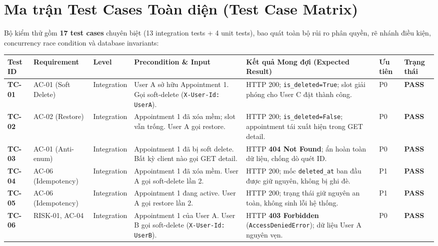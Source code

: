 \documentclass[10pt,a4paper]{article}
\newcommand{\hd}[1]{\sffamily\bfseries\scriptsize #1}
\begin{document}
\section{Ma trận Test Cases Toàn diện (Test Case Matrix)}

Bộ kiểm thử gồm \textbf{17 test cases} chuyên biệt (13 integration tests + 4 unit tests), bao quát toàn bộ rủi ro phân quyền, rẽ nhánh điều kiện, concurrency race condition và database invariants:

\vspace{0.8pt}
\scriptsize
\begin{tabularx}{\linewidth}{@{}P{0.8cm}P{1.8cm}P{1.2cm}P{3.8cm}P{3.5cm}P{0.8cm}Y@{}}
\toprule
{}\hd{Test ID} & \hd{Requirement} & \hd{Level} & \hd{Precondition \& Input} & \hd{Kết quả Mong đợi (Expected Result)} & \hd{Ưu tiên} & \hd{Trạng thái} \\
\midrule
\textbf{TC-01} & AC-01 (Soft Delete) & Integration & User A sở hữu Appointment 1. Gọi soft-delete (\texttt{X-User-Id: UserA}). & HTTP 200; \texttt{is\_deleted=True}; slot giải phóng cho User C đặt thành công. & P0 & \textcolor{passgreen}{\textbf{PASS}} \\
\textbf{TC-02} & AC-02 (Restore) & Integration & Appointment 1 đã xóa mềm; slot vẫn trống. User A gọi restore. & HTTP 200; \texttt{is\_deleted=False}; appointment tái xuất hiện trong GET detail. & P0 & \textcolor{passgreen}{\textbf{PASS}} \\
\textbf{TC-03} & AC-01 (Anti-enum) & Integration & Appointment 1 đã bị soft delete. Bất kỳ client nào gọi GET detail. & HTTP \textbf{404 Not Found}; ẩn hoàn toàn dữ liệu, chống dò quét ID. & P0 & \textcolor{passgreen}{\textbf{PASS}} \\
\textbf{TC-04} & AC-06 (Idempotency) & Integration & Appointment 1 đã xóa mềm. User A gọi soft-delete lần 2. & HTTP 200; mốc \texttt{deleted\_at} ban đầu được giữ nguyên, không bị ghi đè. & P1 & \textcolor{passgreen}{\textbf{PASS}} \\
\textbf{TC-05} & AC-06 (Idempotency) & Integration & Appointment 1 đang active. User A gọi restore lần 2. & HTTP 200; trạng thái giữ nguyên an toàn, không sinh lỗi hệ thống. & P1 & \textcolor{passgreen}{\textbf{PASS}} \\
\textbf{TC-06} & RISK-01, AC-04 & Integration & Appointment 1 của User A. User B gọi soft-delete (\texttt{X-User-Id: UserB}). & HTTP \textbf{403 Forbidden} (\texttt{AccessDeniedError}); dữ liệu User A nguyên vẹn. & P0 & \textcolor{passgreen}{\textbf{PASS}} \\

\end{tabularx}
\end{document}
